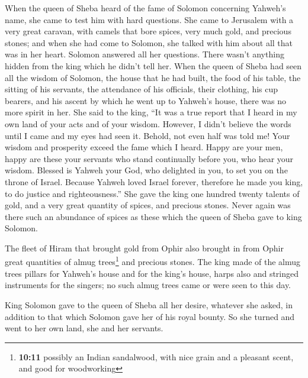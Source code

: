  When the queen of Sheba heard of the fame of Solomon
concerning Yahweh's name, she came to test him with hard questions.
 She came to Jerusalem with a very great caravan, with
camels that bore spices, very much gold, and precious stones; and when
she had come to Solomon, she talked with him about all that was in her
heart.  Solomon answered all her questions. There wasn't
anything hidden from the king which he didn't tell her. 
When the queen of Sheba had seen all the wisdom of Solomon, the house
that he had built,  the food of his table, the sitting of
his servants, the attendance of his officials, their clothing, his cup
bearers, and his ascent by which he went up to Yahweh's house, there was
no more spirit in her.  She said to the king, ``It was a
true report that I heard in my own land of your acts and of your wisdom.
 However, I didn't believe the words until I came and my
eyes had seen it. Behold, not even half was told me! Your wisdom and
prosperity exceed the fame which I heard.  Happy are your
men, happy are these your servants who stand continually before you, who
hear your wisdom.  Blessed is Yahweh your God, who
delighted in you, to set you on the throne of Israel. Because Yahweh
loved Israel forever, therefore he made you king, to do justice and
righteousness.''  She gave the king one hundred twenty
talents of gold, and a very great quantity of spices, and precious
stones. Never again was there such an abundance of spices as these which
the queen of Sheba gave to king Solomon.

 The fleet of Hiram that brought gold from Ophir also
brought in from Ophir great quantities of almug trees\footnote{\textbf{10:11}
  possibly an Indian sandalwood, with nice grain and a pleasant scent,
  and good for woodworking} and precious stones.  The
king made of the almug trees pillars for Yahweh's house and for the
king's house, harps also and stringed instruments for the singers; no
such almug trees came or were seen to this day.

 King Solomon gave to the queen of Sheba all her desire,
whatever she asked, in addition to that which Solomon gave her of his
royal bounty. So she turned and went to her own land, she and her
servants.

